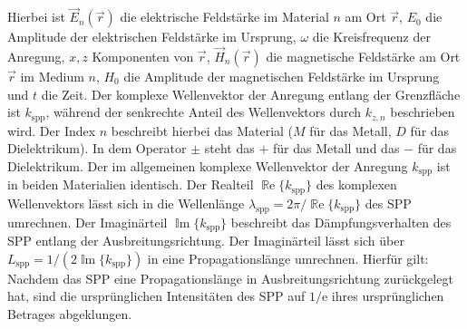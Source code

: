 \documentclass[titlepage,  ngerman]{article}
\renewcommand{\Re}{\operatorname{\mathbb{R}e}}
\renewcommand{\Im}{\operatorname{\mathbb{I}m}}
\begin{document}
	Hierbei ist $\vec{E}_n(\vec{r})$ die elektrische Feldstärke im Material $n$ am Ort $\vec{r}$, $E_0$ die Amplitude der elektrischen Feldstärke im Ursprung, $\omega$ die Kreisfrequenz der Anregung, $x, z$ Komponenten von $\vec{r}$, $\vec{H}_n(\vec{r})$ die magnetische Feldstärke am Ort $\vec{r}$ im Medium $n$, $H_0$ die Amplitude der magnetischen Feldstärke im Ursprung und $t$ die Zeit. Der komplexe Wellenvektor der Anregung entlang der Grenzfläche ist $k_{\mathrm{spp}}$, während der senkrechte Anteil des Wellenvektors durch $k_{z,n}$ beschrieben wird.
	Der Index $n$ beschreibt hierbei das Material ($M$ für das Metall, $D$ für das Dielektrikum). 
	In dem Operator $\pm$ steht das $+$ für das Metall und das $-$ für das Dielektrikum. Der im allgemeinen komplexe Wellenvektor der Anregung $k_{\mathrm{spp}}$ ist in beiden Materialien identisch. Der Realteil $\Re\{k_{\mathrm{spp}}\}$ des komplexen Wellenvektors lässt sich in die Wellenlänge $\lambda_{\mathrm{spp}} = 2\pi/ \Re\{k_{\mathrm{spp}}\} $ des SPP umrechnen. Der Imaginärteil $\Im\{k_{\mathrm{spp}}\}$ beschreibt das Dämpfungsverhalten des SPP entlang der Ausbreitungsrichtung. Der Imaginärteil lässt sich über $L_{\mathrm{spp}} = 1/(2\Im\{k_{\mathrm{spp}}\})$ in eine Propagationslänge umrechnen.  Hierfür gilt: Nachdem das SPP eine Propagationslänge in Ausbreitungsrichtung zurückgelegt hat, sind die ursprünglichen Intensitäten des SPP auf $1/\mathrm{e}$ ihres ursprünglichen Betrages abgeklungen.
	
\end{document}
